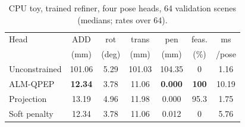 \begin{table}[t]
\centering
\caption{CPU toy, trained refiner, four pose heads, 64 validation scenes (medians; rates over 64).}
\label{tab:e2e}
\scriptsize
\setlength{\tabcolsep}{2.4pt}
\begin{tabular}{@{}lcccccc@{}}
\toprule
Head & ADD & rot & trans & pen & feas. & ms \\
 & (mm) & (deg) & (mm) & (mm) & (\%) & /pose \\
\midrule
Unconstrained & 101.06 & 5.29 & 101.03 & 104.35 & 0 & 1.16 \\
ALM-QPEP & \textbf{12.34} & 3.78 & 11.06 & \textbf{0.000} & \textbf{100} & 10.19 \\
Projection & 13.19 & 4.96 & 11.98 & 0.000 & 95.3 & 1.75 \\
Soft penalty & 12.34 & 3.78 & 11.06 & 0.012 & 0 & 5.76 \\
\bottomrule
\end{tabular}
\end{table}

